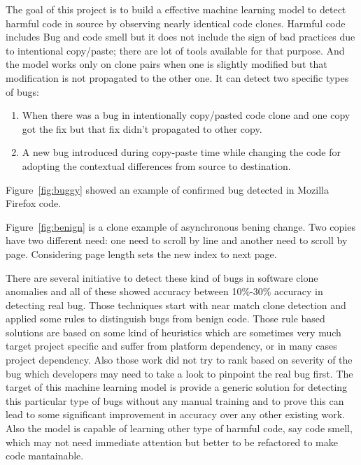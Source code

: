 \documentclass[nocopyrightspace]{sigplanconf}
\begin{document}
The goal of this project is to build a effective machine learning model to detect harmful code in source by observing nearly identical code clones. Harmful code includes Bug and code smell but it does not include the sign of bad practices due to intentional copy/paste; there are lot of tools available for that purpose. And the model works only on clone pairs when one is slightly modified but that modification is not propagated to the other one. It can detect two specific types of bugs:

\begin{enumerate}
\item When there was a bug in intentionally copy/pasted code clone and one copy got the fix but that fix didn’t propagated to other copy.
\item A new bug introduced during copy-paste time while changing the code for adopting the contextual differences from source to destination.
\end{enumerate}

\vspace{10 pt}
\noindent
Figure~\ref{fig:buggy} showed an example of confirmed bug detected in Mozilla Firefox code.

\vspace{10 pt}
\noindent
Figure~\ref{fig:benign} is a clone example of asynchronous bening change. Two copies have two different need: one need to scroll by line and another need to scroll by page. Considering page length sets the new index to next page.


\vspace{10 pt}
\noindent
There are several initiative to detect these kind of bugs in software clone anomalies and all of these showed accuracy between 10\%-30\% accuracy in detecting real bug. Those techniques \cite{Baxter1998,Engler2001,Li2006,Jiang2007,Gabel2010} start with near match clone detection and applied some rules to distinguish bugs from benign code. Those rule based solutions are based on some kind of heuristics which are sometimes very much target project specific and suffer from platform dependency, or in many cases project dependency. Also those work did not try to rank based on severity of the bug which developers may need to take a look to pinpoint the real bug first. The target of this machine learning model is provide a generic solution for detecting this particular type of bugs without any manual training and to prove this can lead to some significant improvement in accuracy over any other existing work. Also the model is capable of learning other type of harmful code, say code smell, which may not need immediate attention but better to be refactored to make code mantainable.
\end{document}
